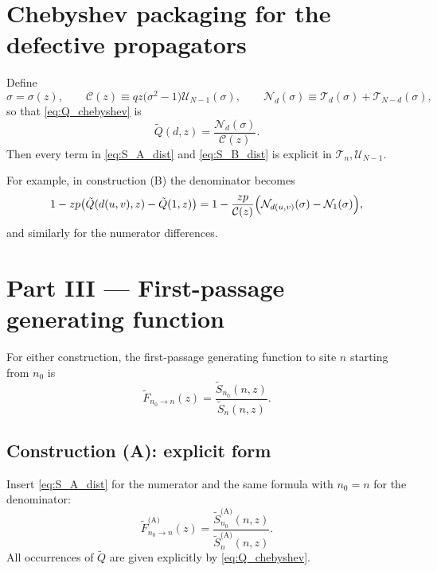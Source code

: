 \documentclass[11pt]{article}
\newcommand{\T}{\mathcal{T}}
\newcommand{\U}{\mathcal{U}}
\begin{document}
\section{Chebyshev packaging for the defective propagators}

Define
\[
\sigma=\sigma(z),\qquad
\mathcal{C}(z)\equiv qz\bigl(\sigma^2-1\bigr)\U_{N-1}(\sigma),\qquad
\mathcal{N}_d(\sigma)\equiv \T_d(\sigma)+\T_{N-d}(\sigma),
\]
so that \eqref{eq:Q_chebyshev} is
\[
\tilde Q(d,z)=\frac{\mathcal{N}_d(\sigma)}{\mathcal{C}(z)}.
\]
Then every term in \eqref{eq:S_A_dist} and \eqref{eq:S_B_dist} is explicit in $\T_n,\U_{N-1}$.

For example, in construction (B) the denominator becomes
\[
1-z p\bigl(\tilde Q(d(u,v),z)-\tilde Q(1,z)\bigr)
=
1-\frac{z p}{\mathcal{C}(z)}\Bigl(\mathcal{N}_{d(u,v)}(\sigma)-\mathcal{N}_{1}(\sigma)\Bigr),
\]
and similarly for the numerator differences.

\section{Part III --- First-passage generating function}

For either construction, the first-passage generating function to site $n$ starting from $n_0$ is
\begin{equation}
\boxed{
\tilde F_{n_0\to n}(z)=\frac{\tilde S_{n_0}(n,z)}{\tilde S_{n}(n,z)}.
}
\label{eq:F_def}
\end{equation}

\subsection{Construction (A): explicit form}
Insert \eqref{eq:S_A_dist} for the numerator and the same formula with $n_0=n$ for the denominator:
\[
\tilde F^{\text{(A)}}_{n_0\to n}(z)=\frac{\tilde S^{\text{(A)}}_{n_0}(n,z)}{\tilde S^{\text{(A)}}_{n}(n,z)}.
\]
All occurrences of $\tilde Q$ are given explicitly by \eqref{eq:Q_chebyshev}.
\end{document}
